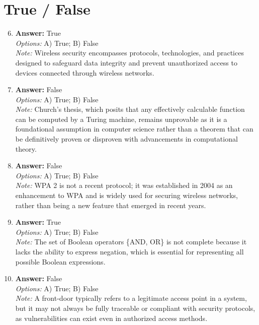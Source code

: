 \documentclass[12pt]{article}
\begin{document}
\section*{True / False}
\begin{enumerate}[label=\arabic*.]
\setcounter{enumi}{5}
\item \textbf{Answer:} True
\\ \textit{Options:} A) True; B) False
\\ \textit{Note:} Wireless security encompasses protocols, technologies, and practices designed to safeguard data integrity and prevent unauthorized access to devices connected through wireless networks.
\item \textbf{Answer:} False
\\ \textit{Options:} A) True; B) False
\\ \textit{Note:} Church's thesis, which posits that any effectively calculable function can be computed by a Turing machine, remains unprovable as it is a foundational assumption in computer science rather than a theorem that can be definitively proven or disproven with advancements in computational theory.
\item \textbf{Answer:} False
\\ \textit{Options:} A) True; B) False
\\ \textit{Note:} WPA 2 is not a recent protocol; it was established in 2004 as an enhancement to WPA and is widely used for securing wireless networks, rather than being a new feature that emerged in recent years.
\item \textbf{Answer:} True
\\ \textit{Options:} A) True; B) False
\\ \textit{Note:} The set of Boolean operators \{AND, OR\} is not complete because it lacks the ability to express negation, which is essential for representing all possible Boolean expressions.
\item \textbf{Answer:} False
\\ \textit{Options:} A) True; B) False
\\ \textit{Note:} A front-door typically refers to a legitimate access point in a system, but it may not always be fully traceable or compliant with security protocols, as vulnerabilities can exist even in authorized access methods.
\end{enumerate}
\end{document}
